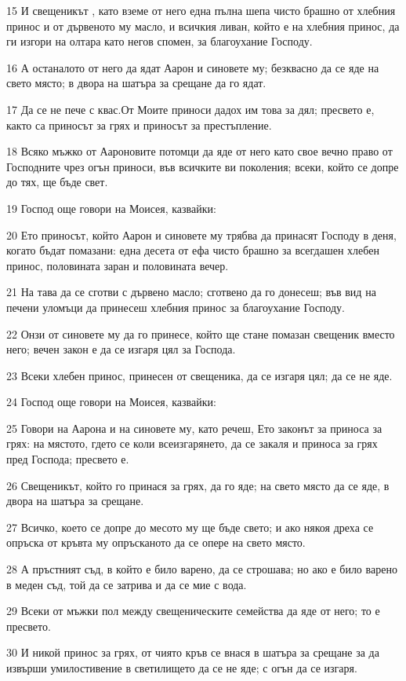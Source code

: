 \par 15 И свещеникът , като вземе от него една пълна шепа чисто брашно от хлебния принос и от дървеното му масло, и всичкия ливан, който е на хлебния принос, да ги изгори на олтара като негов спомен, за благоухание Господу.
\par 16 А останалото от него да ядат Аарон и синовете му; безквасно да се яде на свето място; в двора на шатъра за срещане да го ядат.
\par 17 Да се не пече с квас.От Моите приноси дадох им това за дял; пресвето е, както са приносът за грях и приносът за престъпление.
\par 18 Всяко мъжко от Аароновите потомци да яде от него като свое вечно право от Господните чрез огън приноси, във всичките ви поколения; всеки, който се допре до тях, ще бъде свет.
\par 19 Господ още говори на Моисея, казвайки:
\par 20 Ето приносът, който Аарон и синовете му трябва да принасят Господу в деня, когато бъдат помазани: една десета от ефа чисто брашно за всегдашен хлебен принос, половината заран и половината вечер.
\par 21 На тава да се сготви с дървено масло; сготвено да го донесеш; във вид на печени уломъци да принесеш хлебния принос за благоухание Господу.
\par 22 Онзи от синовете му да го принесе, който ще стане помазан свещеник вместо него; вечен закон е да се изгаря цял за Господа.
\par 23 Всеки хлебен принос, принесен от свещеника, да се изгаря цял; да се не яде.
\par 24 Господ още говори на Моисея, казвайки:
\par 25 Говори на Аарона и на синовете му, като речеш, Ето законът за приноса за грях: на мястото, гдето се коли всеизгарянето, да се закаля и приноса за грях пред Господа; пресвето е.
\par 26 Свещеникът, който го принася за грях, да го яде; на свето място да се яде, в двора на шатъра за срещане.
\par 27 Всичко, което се допре до месото му ще бъде свето; и ако някоя дреха се опръска от кръвта му опръсканото да се опере на свето място.
\par 28 А пръстният съд, в който е било варено, да се строшава; но ако е било варено в меден съд, той да се затрива и да се мие с вода.
\par 29 Всеки от мъжки пол между свещеническите семейства да яде от него; то е пресвето.
\par 30 И никой принос за грях, от чиято кръв се внася в шатъра за срещане за да извърши умилостивение в светилището да се не яде; с огън да се изгаря.

